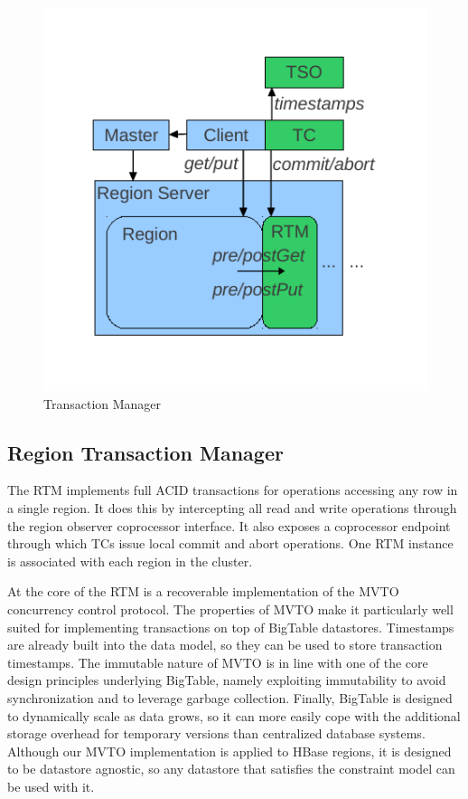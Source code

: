 \documentclass[10pt,final,journal]{IEEEtran}
\begin{document}
\begin{figure}[!t]
\centering
\hspace*{-.15in}
\includegraphics{images/tm.pdf}
\caption{Transaction Manager}
\label{tm}
\end{figure}

\subsection{Region Transaction Manager}
The RTM implements full ACID transactions for operations accessing any row in a single region. It does this by intercepting all read and write operations through the region observer coprocessor interface. It also exposes a coprocessor endpoint through which TCs issue local commit and abort operations. One RTM instance is associated with each region in the cluster.

At the core of the RTM is a recoverable implementation of the MVTO concurrency control protocol. The properties of MVTO make it particularly well suited for implementing transactions on top of BigTable datastores. Timestamps are already built into the data model, so they can be used to store transaction timestamps. The immutable nature of MVTO is in line with one of the core design principles underlying BigTable, namely exploiting immutability to avoid synchronization and to leverage garbage collection. Finally, BigTable is designed to dynamically scale as data grows, so it can more easily cope with the additional storage overhead for temporary versions than centralized database systems. Although our MVTO implementation is applied to HBase regions, it is designed to be datastore agnostic, so any datastore that satisfies the constraint model can be used with it.
\end{document}
